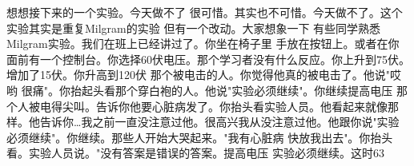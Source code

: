 想想接下来的一个实验。今天做不了 很可惜。其实也不可惜。今天做不了。这个实验其实是重复Milgram的实验 但有一个改动。大家想象一下 有些同学熟悉Milgram实验。我们在班上已经讲过了。你坐在椅子里 手放在按钮上。或者在你面前有一个控制台。你选择60伏电压。那个学习者没有什么反应。你上升到75伏。增加了15伏。你升高到120伏 那个被电击的人。你觉得他真的被电击了。他说"哎哟 很痛"。你抬起头看那个穿白袍的人。他说"实验必须继续"。你继续提高电压 那个人被电得尖叫。告诉你他要心脏病发了。你抬头看实验人员。他看起来就像那样。他告诉你…我之前一直没注意过他。很高兴我从没注意过他。他跟你说"实验必须继续"。你继续。那些人开始大哭起来。"我有心脏病 快放我出去"。你抬头看。实验人员说。"没有答案是错误的答案。提高电压 实验必须继续。这时63%

